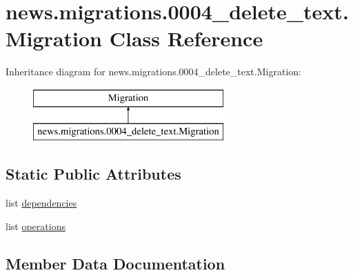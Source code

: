 \hypertarget{classnews_1_1migrations_1_10004__delete__text_1_1_migration}{}\section{news.\+migrations.0004\+\_\+delete\+\_\+text.Migration Class Reference}
\label{classnews_1_1migrations_1_10004__delete__text_1_1_migration}
Inheritance diagram for news.\+migrations.0004\+\_\+delete\+\_\+text.Migration\+:\begin{figure}[H]
\begin{center}
\leavevmode
\includegraphics[height=2.000000cm]{classnews_1_1migrations_1_10004__delete__text_1_1_migration}
\end{center}
\end{figure}
\subsection*{Static Public Attributes}
\begin{DoxyCompactItemize}
\item 
list \mbox{\hyperlink{classnews_1_1migrations_1_10004__delete__text_1_1_migration_a8ffd54d8b8a09e031987f159e869208f}{dependencies}}
\item 
list \mbox{\hyperlink{classnews_1_1migrations_1_10004__delete__text_1_1_migration_a2f379b87d68991adbc82291d97785652}{operations}}
\end{DoxyCompactItemize}


\subsection{Member Data Documentation}
\mbox{\label{classnews_1_1migrations_1_10004__delete__text_1_1_migration_a8ffd54d8b8a09e031987f159e869208f}} 
